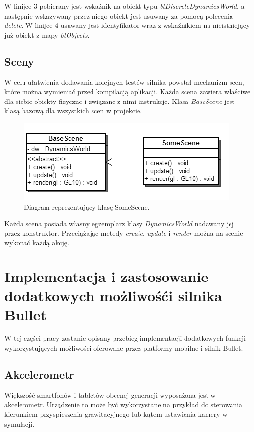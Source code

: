 W linijce 3 pobierany jest wskaźnik na obiekt typu
\emph{btDiscreteDynamicsWorld}, a następnie wskazywany przez niego obiekt jest
usuwany za pomocą polecenia \emph{delete}. W linijce 4 usuwany jest
identyfikator wraz z wskaźnikiem na nieistniejący już obiekt z mapy
\emph{btObjects}.

\newpage
\subsection{Sceny}
W celu ułatwienia dodawania kolejnych testów silnika powstał mechanizm scen,
które można wymieniać przed kompilacją aplikacji. Każda scena zawiera właściwe
dla siebie obiekty fizyczne i związane z nimi instrukcje. Klasa \emph{BaseScene}
jest klasą bazową dla wszystkich scen w projekcie.

\begin{figure}[H]
\centering
\includegraphics[scale=0.6]{./img/SceneClassDiagram.png}
\caption{Diagram reprezentujący klasę SomeScene.}
\label{fig:sceneClassDiagram}
\end{figure}

Każda scena posiada własny egzemplarz klasy \emph{DynamicsWorld} nadawany jej
przez konstruktor. Przeciążając metody \emph{create}, \emph{update} i
\emph{render} można na scenie wykonać każdą akcję.

\newpage
\section{Implementacja i zastosowanie dodatkowych możliwośći silnika
Bullet}\label{sec:dod}
W tej części pracy zostanie opisany przebieg implementacji
dodatkowych funkcji wykorzystujących możliwości oferowane przez platformy
mobilne i silnik Bullet.

\subsection{Akcelerometr}
Większość smartfonów i tabletów obecnej generacji wyposażona jest w
akcelerometr. Urządzenie to może być wykorzystane na przykład do sterowania
kierunkiem przyspieszenia grawitacyjnego lub kątem ustawienia kamery w
symulacji.

